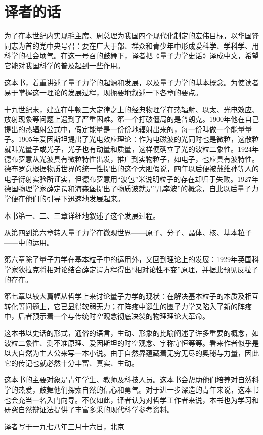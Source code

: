 \chapter{译者的话}

为了在本世纪内实现毛主席、周总理为我国四个现代化制定的宏伟目标，以华国锋同志为首的党中央号召：要在广大于部、群众和青少年中形成爱科学、学科学、用科学的社会顷气。在这一号召的鼓舞下，译者把《量子力学史话》译成中文，希望它能对我国科学的普及起到一些作用。

这本书，着重讲述了量子力学的起源和发展，以及量子力学的基本概念。为使读者易于掌握这一理论的发展过程，现扼要地叙述一下各章的要点。

十九世纪末，建立在牛顿三大定律之上的经典物理学在热辐射、以太、光电效应、放射现象等问题上遇到了严重困难。笫一个打破僵局的是普朗克。1900年他在自己提出的热辐射公式中，假定能量是一份份地辐射出来的，每一份叫做一个能量量子。1905年爱因斯坦提出了光电效应理论：作为电磁波的光同时也是微粒，这散粒就叫光量子或光子，光子也有动量和质量，这样便确立了光的波粒二象性。1924年德布罗意从光波具有微粒特性出发，推广到实物粒子，如电子，也应具有波特性。德布罗意根据物质世界的统一性提出的这个大胆假说，四年以后便被戴维孙等人的电子衍射实验所证实，但德布罗意用“波包”米说明粒子的存在却归于失败。1927年德国物理学家薛定谔和海森堡提出了物质波就是”几率波”的概念，自此以后量子力学便在他们的引导下迅速地发展起来。

本书笫一、二、三章详细地叙述了这个发展过程。

从第四到第六章转入量子力学在微观世界——原子、分子、晶体、核、基本粒子——中的运用。

笫六章除了量子力学在基本粒子中的运用外，又回到理论上的发展：1929年英国科学家狄拉克将相对论结合薛定谔方程得出“相对论性不变”原理，并据此预见反粒子的存在。

笫七章以较大篇幅从哲学上来讨论量子力学的现状：在解决基本粒子的本质及相互转化等问题上，它已显得软弱无力；在阵疼中诞生的匮子力学又陷入了新的阵疼中，后者预示着一个与传统时空观念彻底决裂的物理理论大革命。

这本书以史话的形式，通俗的语言，生动、形象的比喻阐述了许多重要的概念，如波粒二象性、测不准原理、爱因斯坦的时空观念、宇称守恒等等。看来作者似乎是以大自然为主人公来写一本小说。由于自然界蕴藏着无穷无尽的奥秘与力量，因此它的传记也就必然十分丰富、真实、生动。

这本书的主要对象是青年学生、教师及科技人员。这本书会帮助他们培养对自然科学的热爱，鼓舞他们探索自然的信心和勇气。对于进一步深造的青年来说，这本书也会充当一名入门向导。不仅如此，译者认为对哲学工作者来说，本书也为学习和研究自然辩证法提供了丰富多采的现代科学参考资料。

译者写于一九七八年三月十六日，北京
